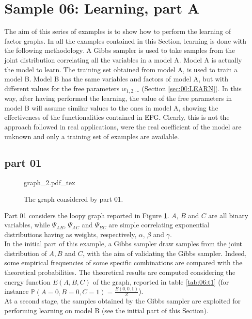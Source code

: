 
\section{Sample 06: Learning, part A}

The aim of this series of examples is to show how to perform the learning of factor graphs.
In all the examples contained in this Section, learning is done with the following methodology.
A Gibbs sampler is used to take samples from the joint distribution correlating all the variables in a model A. Model A is actually the model to learn. The training set obtained from model A, is used to train a model B. Model B has the same variables and factors of model A, but with different values for the free parameters $w_{1,2,\cdots}$ (Section \ref{sec:00:LEARN}). In this way, after having performed the learning, the value of the free parameters in model B will assume similar values to the ones in model A, showing the effectiveness of the functionalities contained in EFG. Clearly, this is not the approach followed in real applications, were the real coefficient of the model are unknown and only a training set of examples are available.

\subsection{part 01}

\begin{figure}
	\centering
\def\svgwidth{0.3 \textwidth}
{graph_2.pdf_tex} 
\caption{The graph considered by part 01.}
\label{fig:sample_06:0}
\end{figure}

Part 01 considers the loopy graph reported in Figure \ref{fig:sample_06:0}. $A$, $B$ and $C$ are all binary variables, while $\Psi_{AB}$, $\Psi_{AC}$ and $\Psi_{BC}$ are simple correlating exponential distributions having as weights, respectively, $\alpha$, $\beta$ and $\gamma$. 
\\
In the initial part of this example, a Gibbs sampler draw samples from the joint distribution of $A,B$ and $C$, with the aim of validating the Gibbs sampler. Indeed, some empirical frequencies of some specific combinations are compared with the theoretical probabilities. The theoretical results are computed considering the energy function $E(A,B,C)$ of the graph, reported in table \ref{tab:06:t1} (for instance $\mathbb{P}(A=0, B=0, C=1) = \frac{E(0,0,1)}{Z}$).
\\
At a second stage, the samples obtained by the Gibbs sampler are exploited for performing learning on model B (see the initial part of this Section).

